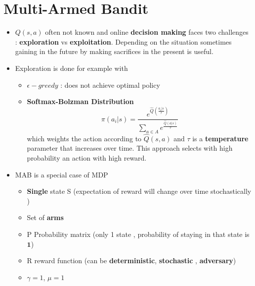 \documentclass[12pt]{article} %
\begin{document}
\section{Multi-Armed Bandit}
\begin{itemize}
\item $Q(s,a)$ often not known and online \textbf{decision making} faces two challenges : \textbf{exploration} vs \textbf{exploitation}. Depending on the situation sometimes gaining in the future by making sacrifices in the present is useful.
\item Exploration is done for example with
\begin{itemize}
\item $\epsilon-greedy$  : does not achieve optimal policy
\item \textbf{Softmax-Bolzman Distribution} 
$$ \pi(a_i|s) = \frac{e^{\hat{Q}(\frac{a_i|s}{\tau})}}{\sum_{a \in A}e^{\frac{\hat{Q}(a|s)}{\tau}}}$$
which weights the action according to $\hat{Q}(s,a)$ and $\tau$ is a \textbf{temperature} parameter that increases over time. This approach selects with high probability an action with high reward.
\end{itemize}

\item MAB is a special case of MDP
\begin{itemize}
\item \textbf{Single } state S (expectation of reward will change over time stochastically )
\item Set of \textbf{arms} 
\item P Probability matrix (only 1 state , probability of staying in that state is $\bm{1}$)
\item R reward function (can be \textbf{deterministic}, \textbf{stochastic} , \textbf{adversary})
\item $\gamma=1$, $\mu=1$
\end{itemize}
\end{itemize}
\end{document}
